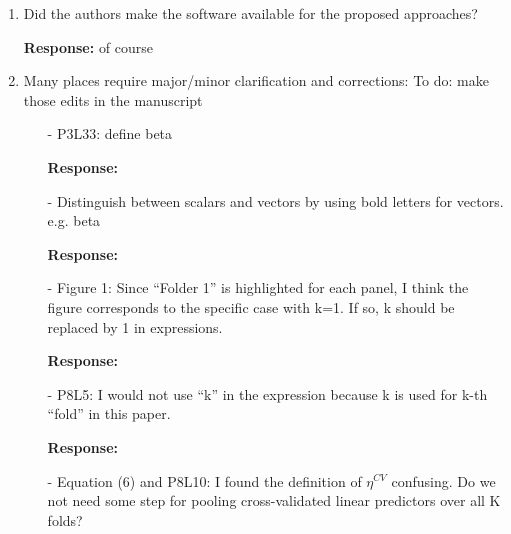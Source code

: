 \documentclass[12]{article}
\newcommand{\re}{\textbf{Response: }}
\newcommand\bd[1]{{\color{blue}#1}}
\begin{document}
\begin{enumerate}[align = left]
\begin{enumerate}
    \re \bd{I remember looking at higher censorings before. the conclusion doesn't change with the censoring proportion. We can include this in the writing, rather than including more simulations}

    \item Table 2 - Why only present the number of true positives here? I suggest presenting other operating characteristics such as TPR, NPR, PPV, etc... Then the results might help better justify the findings from the application. For example, depending on the results, referring to the simulation results could strengthen the argument given at the end of the second paragraph in Discussion (which is quite speculative in my opinion).
    
    \re \bd{one argument would be we are evaluting the predictive performance. This comment can be addressed jointly with Reviewer 1's comment 8}
    
\end{enumerate}

\item Did the authors make the software available for the proposed approaches?

\re \bd{of course}

\item Many places require major/minor clarification and corrections:
\bd{To do: make those edits in the manuscript}
\begin{itemize}[align = left]
\item[-]  P3L33: define beta

\re

\item[-] Distinguish between scalars and vectors by using bold letters for vectors. e.g. beta

\re

\item[-] Figure 1: Since “Folder 1” is highlighted for each panel, I think the figure corresponds to the specific case with k=1. If so, k should be replaced by 1 in expressions.

\re

\item[-]  P8L5: I would not use “k” in the expression because k is used for k-th “fold” in this paper.

\re

\item[-]  Equation (6) and P8L10: I found the definition of $\eta^{CV}$ confusing. Do we not need some step for pooling cross-validated linear predictors over all K folds?


\end{itemize}
\end{enumerate}
\end{document}
